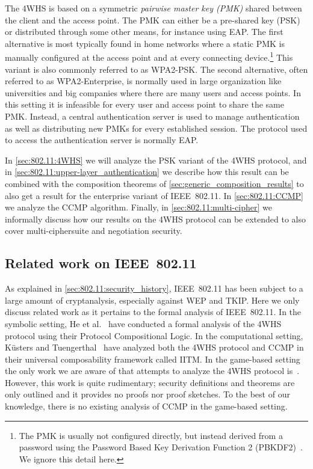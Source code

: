 The 4WHS is based on a symmetric \emph{pairwise master key (PMK)} shared between the client and the access point.
The PMK can either be a pre-shared key (PSK)
or distributed through some other means,
for instance using EAP.
The first alternative is  most typically found in home networks where a static PMK is manually configured at the access point and at every connecting device.\footnote{The PMK is usually not configured directly,
but instead derived from a password using the Password Based Key Derivation Function 2 (PBKDF2)~\cite{IETF:RFC8018:PBKDF2}. 
We ignore this detail here.
}
This variant is also commonly referred to as WPA2-PSK.
The second alternative,
often referred to as WPA2-Enterprise,
is normally used in large organization like universities and big companies where there are many users and access points.
In this setting it is infeasible for every user and access point to share the same PMK.
Instead,
a central authentication server is used to manage authentication as well as distributing new  PMKs for every established session.
The protocol used to access the authentication server is normally EAP. 
  
In \cref{sec:802.11:4WHS} we will analyze the PSK variant of the 4WHS protocol,
and in \cref{sec:802.11:upper-layer_authentication} we describe how this result can be combined with the composition theorems of \cref{sec:generic_composition_results}
to also get a result for the enterprise variant of IEEE~802.11.
In \cref{sec:802.11:CCMP} we analyze the CCMP algorithm.
Finally,
in \cref{sec:802.11:multi-cipher} we informally discuss how our results on the 4WHS protocol can be extended to also cover multi-ciphersuite and negotiation security.


\subsection{Related work on IEEE~802.11}
As explained in \cref{sec:802.11:security_history},
IEEE~802.11 has been subject to a large amount of cryptanalysis,
especially against WEP and TKIP.
Here we only discuss related work as it pertains to the formal analysis of IEEE~802.11.
In the symbolic setting, 
He et al.~\cite{CCS:HSDDM05} have conducted a formal analysis of the 4WHS protocol using their Protocol Compositional Logic.
In the computational setting,
Küsters and Tuengerthal~\cite{RSA:KusTue11, CCS:KusTue11} have analyzed both the 4WHS protocol and CCMP in their universal composability framework called IITM.
In the game-based setting the only work we are aware of that attempts to analyze the 4WHS protocol is~\cite{ZhangMM:2005:802.11_claimed}.
However,
this work is quite rudimentary;
security definitions and theorems are only outlined and it provides no proofs nor proof sketches.
To the best of our knowledge,
there is no existing analysis of CCMP in the game-based setting.







